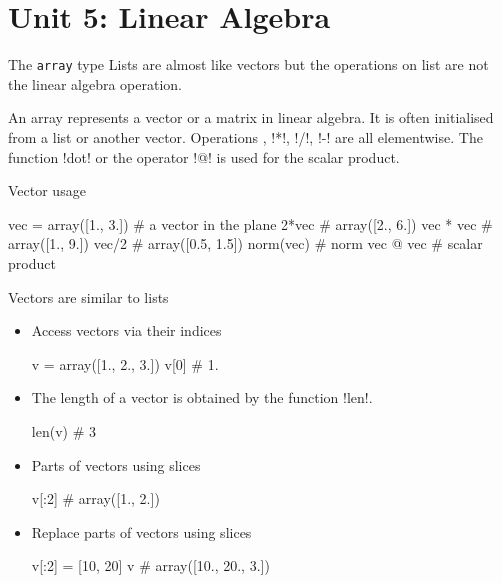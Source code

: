 \documentclass[hyperref={pdfpagelabels=false},table]{beamer}
\begin{document}
\part{Unit 5: Linear Algebra}



\begin{frame}[fragile]{The \texttt{array} type}
Lists are almost like vectors but the operations on list are \alert{not} the linear algebra operation.
\begin{defblock}An \alert{array} represents a vector or a matrix in linear algebra. It is often initialised from a list or another vector. Operations \pyth{+}, \pyth!*!, \pyth!/!, \pyth!-! are all \alert{elementwise}. The function \pyth!dot! or the operator \pyth!@! is used for the scalar product.
\end{defblock}

\end{frame}

\begin{frame}[fragile]{Vector usage}
\begin{example}
\begin{python}
vec = array([1., 3.]) # a vector in the plane
2*vec # array([2., 6.])
vec * vec # array([1., 9.])
vec/2 # array([0.5, 1.5])
norm(vec) # norm
vec @ vec # scalar product
\end{python}
\end{example}
\end{frame}

\begin{frame}[fragile]{Vectors are similar to lists}
\begin{itemize}
\item Access vectors via their indices
\begin{python}
v = array([1., 2., 3.])
v[0] # 1.
\end{python}
\item The \alert{length} of a vector is obtained by the function \pyth!len!.
\begin{python}
len(v) # 3
\end{python}
\item Parts of vectors using slices
\begin{python}
v[:2] # array([1., 2.])
\end{python}
\item Replace parts of vectors using slices
\begin{python}
v[:2] = [10, 20]
v # array([10., 20., 3.])
\end{python}
\end{itemize}
\end{frame}
\end{document}

